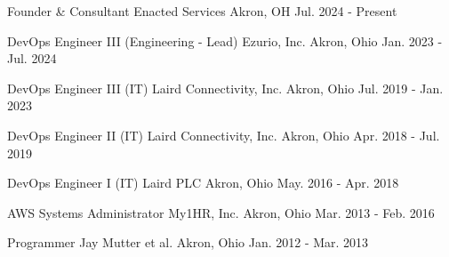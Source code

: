 

\begin{cventries}

  \cventry
    {Founder \& Consultant} %
    {Enacted Services} %
    {Akron, OH} %
    {Jul. 2024 - Present} %
    {
    }

  \cventry
    {DevOps Engineer III (Engineering - Lead)} %
    {Ezurio, Inc.} %
    {Akron, Ohio} %
    {Jan. 2023 - Jul. 2024} %
    {
    }

  \cventry
    {DevOps Engineer III (IT)} %
    {Laird Connectivity, Inc.} %
    {Akron, Ohio} %
    {Jul. 2019 - Jan. 2023} %
    {
    }

  \cventry
    {DevOps Engineer II (IT)} %
    {Laird Connectivity, Inc.} %
    {Akron, Ohio} %
    {Apr. 2018 - Jul. 2019} %
    {
    }

  \cventry
    {DevOps Engineer I (IT)} %
    {Laird PLC} %
    {Akron, Ohio} %
    {May. 2016 - Apr. 2018} %
    {
    }

  \cventry
    {AWS Systems Administrator} %
    {My1HR, Inc.} %
    {Akron, Ohio} %
    {Mar. 2013 - Feb. 2016} %
    {
    }

  \cventry
    {Programmer} %
    {Jay Mutter et al.} %
    {Akron, Ohio} %
    {Jan. 2012 - Mar. 2013} %
    {
    }

\end{cventries}
